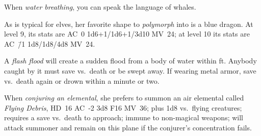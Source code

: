 \documentclass[a4paper,serif]{rpg-module}
\begin{document}
When \emph{water breathing}, you can speak the language of whales.

As is typical for elves, her favorite shape to \emph{polymorph} into
is a blue dragon. At level 9, its stats are AC~0 1d6+1/1d6+1/3d10
MV~24; at level 10 its stats are AC~\=/1 1d8/1d8/4d8 MV~24.

A \emph{flash flood} will create a sudden flood from a body of water
within \unit[30]{ft}. Anybody caught by it must save vs.~death or be
swept away. If wearing metal armor, save vs.~death again or drown
within a minute or two.
  
When \emph{conjuring an elemental}, she prefers to summon an air
elemental called \emph{Flying Debris}, HD~16 AC~-2 3d8 F16 MV~36; plus
1d8 vs.~flying creatures; requires a save vs.~death to approach;
immune to non-magical weapons; will attack summoner and remain on this
plane if the conjurer's concentration fails.

\newpage

\tableofcontents
\end{document}
